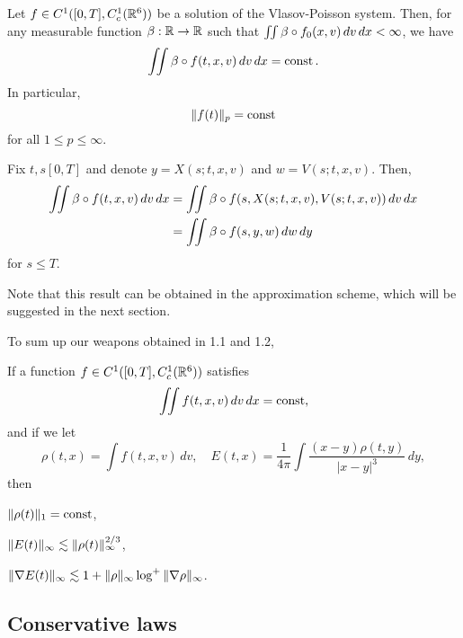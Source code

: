 \documentclass[11pt]{amsart}
\begin{document}
\begin{cor}
Let $f\in C^1([0,T],C_c^1(\mathbb{R}^6))$ be a solution of the Vlasov-Poisson system.
Then, for any measurable function $\beta:\R\to\R$ such that $\iint\beta\o f_0(x,v)\,dv\,dx<\infty$, we have
\[\iint\beta\o f(t,x,v)\,dv\,dx=\const.\]
In particular,
\[\|f(t)\|_p=\operatorname{const}\]
for all $1\le p\le\infty$.
\end{cor}
\begin{pf}
Fix $t,s[0,T]$ and denote $y=X(s;t,x,v)$ and $w=V(s;t,x,v)$.
Then,
\begin{align*}
\iint\beta\o f(t,x,v)\,dv\,dx
&=\iint\beta\o f(s,X(s;t,x,v),V(s;t,x,v))\,dv\,dx\\
&=\iint\beta\o f(s,y,w)\,dw\,dy
\end{align*}
for $s\le T$.
\end{pf}
\begin{rmk}
Note that this result can be obtained in the approximation scheme, which will be suggested in the next section.
\end{rmk}

To sum up our weapons obtained in 1.1 and 1.2,
\begin{cor}
If a function $f\in C^1([0,T],C_c^1(\mathbb{R}^6))$ satisfies
\[\iint f(t,x,v)\,dv\,dx=\operatorname{const},\]
and if we let
\[\rho(t,x)=\int f(t,x,v)\,dv,\quad E(t,x)=\frac1{4\pi}\int\frac{(x-y)\rho(t,y)}{|x-y|^3}\,dy,\]
then
\begin{cond}
\item $\|\rho(t)\|_1=\operatorname{const}$,
\item $\|E(t)\|_\infty\lesssim\|\rho(t)\|_\infty^{2/3}$,
\item $\|\nabla E(t)\|_\infty\lesssim1+\|\rho\|_\infty\log^+\|\nabla\rho\|_\infty$.
\end{cond}
\end{cor}



\subsection{Conservative laws}
\end{document}
